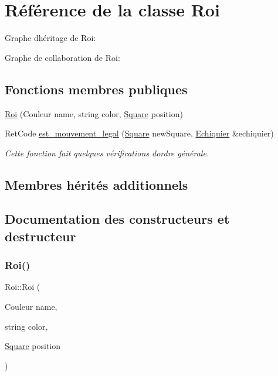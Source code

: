 \hypertarget{classRoi}{}\section{Référence de la classe Roi}
\label{classRoi}


Graphe d\textquotesingle{}héritage de Roi\+:


Graphe de collaboration de Roi\+:
\subsection*{Fonctions membres publiques}
\begin{DoxyCompactItemize}
\item 
\hyperlink{classRoi_a7ded82e947fce0f9cbac13ab086a43bb}{Roi} (Couleur name, string color, \hyperlink{classSquare}{Square} position)
\item 
Ret\+Code \hyperlink{classRoi_abba3adc6d75ad23c0a1293ffcd4741ee}{est\+\_\+mouvement\+\_\+legal} (\hyperlink{classSquare}{Square} new\+Square, \hyperlink{classEchiquier}{Echiquier} \&echiquier)
\begin{DoxyCompactList}\small\item\em Cette fonction fait quelques vérifications d\textquotesingle{}ordre générale. \end{DoxyCompactList}\end{DoxyCompactItemize}
\subsection*{Membres hérités additionnels}


\subsection{Documentation des constructeurs et destructeur}
\mbox{\label{classRoi_a7ded82e947fce0f9cbac13ab086a43bb}} 
\subsubsection{\texorpdfstring{Roi()}{Roi()}}
{\footnotesize\ttfamily Roi\+::\+Roi (\begin{DoxyParamCaption}\item[{Couleur}]{name,  }\item[{string}]{color,  }\item[{\hyperlink{classSquare}{Square}}]{position }\end{DoxyParamCaption})}


